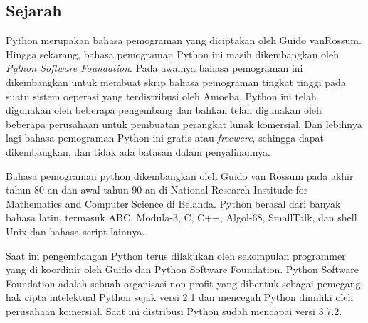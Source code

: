 \subsection{Sejarah}
Python merupakan bahasa pemograman yang diciptakan oleh Guido vanRossum. Hingga sekarang, bahasa pemograman Python ini masih dikembangkan oleh \textit{Python Software Foundation}. Pada awalnya bahasa pemograman ini dikembangkan untuk membuat skrip bahasa pemograman tingkat tinggi pada suatu sistem oeperasi yang terdistribusi oleh Amoeba. Python ini telah digunakan oleh beberapa pengembang dan bahkan telah digunakan oleh beberapa perusahaan untuk pembuatan perangkat lunak komersial. Dan lebihnya lagi bahasa pemograman Python ini gratis atau \textit{freewere}, sehingga dapat dikembangkan, dan tidak ada batasan dalam penyalinannya.

Bahasa pemograman python dikembangkan oleh Guido van Rossum pada akhir tahun 80-an dan awal tahun 90-an di National Research Institude for Mathematics and Computer Science di Belanda. Python berasal dari banyak bahasa latin, termasuk ABC, Modula-3, C, C++, Algol-68, SmallTalk, dan shell Unix dan bahasa script lainnya.

Saat ini pengembangan Python terus dilakukan oleh sekompulan programmer yang di koordinir oleh Guido dan Python Software Foundation. Python Software Foundation adalah sebuah organisasi non-profit yang dibentuk sebagai pemegang hak cipta intelektual Python sejak versi 2.1 dan mencegah Python dimiliki oleh perusahaan komersial. Saat ini distribusi Python sudah mencapai versi 3.7.2.

